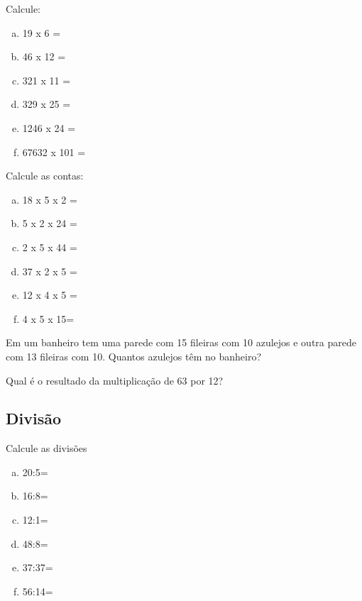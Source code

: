 \item Calcule:
\begin{multicols}{3}
\begin{enumerate}[a)]
	\item 19 x 6 =
	\item 46 x 12 =
	\item 321 x 11 =
	\item 329 x 25 =
	\item 1246 x 24 =
	\item 67632 x 101 =
\end{enumerate}
\end{multicols}

\item Calcule as contas:
\begin{multicols}{3}
\begin{enumerate}[a)]
	\item 18 x 5 x 2 =
	\item 5 x 2 x 24 =
	\item 2 x 5 x 44 =
	\item 37 x 2 x 5 =
	\item 12 x 4 x 5 =
	\item 4 x 5 x 15=
\end{enumerate}
\end{multicols}

\item Em um banheiro tem uma parede com 15 fileiras com 10 azulejos e outra parede com 13 fileiras com 10. Quantos azulejos têm no banheiro? 

\item  Qual é o resultado da multiplicação de 63 por 12? 



\subsection{Divisão}


\item Calcule as divisões
\begin{multicols}{3}
\begin{enumerate}[a)]
	\item 20:5=
	\item 16:8=
	\item 12:1=
	\item 48:8=
	\item 37:37=
	\item 56:14=
\end{enumerate}
\end{multicols}

